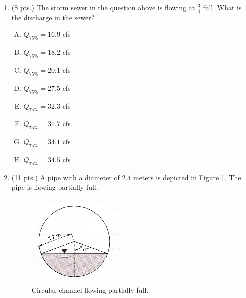 \documentclass[11pt]{article}
\begin{document}
\begin{enumerate}
\begin{enumerate} [(A)]
\item  $17.8$ cfs
\item  $19.2$ cfs
\item  $20.6$ cfs
\item  $28.9$ cfs
\item  $31.2$ cfs
\item  $33.4$ cfs
\item  $35.9$ cfs
\item  $36.4$ cfs
\end{enumerate}


\clearpage
\item (8 pts.)
The storm sewer in the question above is flowing at $\frac{3}{4}$ full.  What is the discharge in the sewer?
\begin{enumerate} [(A)]
\item  $Q_{75\%}= 16.9$ cfs
\item  $Q_{75\%}= 18.2$ cfs
\item  $Q_{75\%}= 20.1$ cfs
\item  $Q_{75\%}= 27.5$ cfs
\item  $Q_{75\%}= 32.3$ cfs
\item  $Q_{75\%}= 31.7$ cfs
\item  $Q_{75\%}= 34.1$ cfs
\item  $Q_{75\%}= 34.5$ cfs
\end{enumerate}
\item  (11 pts.)
A pipe with a diameter of $2.4$ meters is depicted in Figure \ref{fig:CircularSewerToo}.   The pipe is flowing partially full.

\begin{figure}[h!] %
\centering
   \includegraphics[width=1.9in]{CircularSewerToo.jpg}
   \caption{Circular channel flowing partially full.}
   \label{fig:CircularSewerToo} 
\end{figure}


\end{enumerate}
\end{document}
